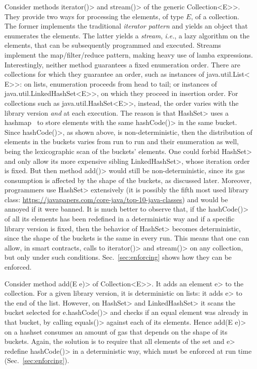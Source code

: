 Consider methods \<iterator()> and \<stream()> of the generic
\<Collection$\text{<}$E$\text{>}$>. They provide two ways for
processing the elements, of type $E$, of a collection. The former implements
the traditional \emph{iterator pattern} and yields an object that enumerates
the elements. The latter yields a \emph{stream}, \emph{i.e.},
a lazy algorithm on the
elements, that can be subsequently programmed and executed.
Streams implement the map/filter/reduce pattern, making
heavy use of lamba expressions.
Interestingly, neither method
guarantees a fixed enumeration order.
There are collections for which they
guarantee an order, such as instances of \<java.util.List$\text{<}$E$\text{>}$>:
on lists, enumeration proceeds from head to tail;
or instances of \<java.util.LinkedHashSet$\text{<}$E$\text{>}$>, on which they proceed in
insertion order.
For collections such as \<java.util.HashSet$\text{<}$E$\text{>}$>, instead, the order
varies with the library version \emph{and} at each execution. The reason is that
\<HashSet> uses a hashmap~\cite{CormenLRS09}
to store elements with the same \<hashCode()> in the same bucket.
Since \<hashCode()>, as shown above, is non-deterministic, then
the distribution of elements in the buckets varies from run to run and their enumeration
as well, being the lexicographic scan of the buckets' elements.
One could forbid \<HashSet> and only allow its
more expensive sibling \<LinkedHashSet>, whose iteration order is fixed.
But then method \<add()> would still be non-deterministic, since its gas consumption
is affected by the shape of the buckets, as discussed later.
Moreover, programmers use \<HashSet> extensively
(it is possibly the fifth most used library class:
\url{https://javapapers.com/core-java/top-10-java-classes})
and would be annoyed if it were
banned. It is much better to observe that,
if the \<hashCode()> of all its elements has been redefined in a deterministic way
and if a specific library version is fixed, then the behavior of \<HashSet> becomes
deterministic, since the shape of the buckets is the same in every run. This means that one
can allow, in smart contracts, calls to \<iterator()> and \<stream()> on any collection,
but only under such conditions. Sec.~\ref{sec:enforcing} shows how they can be enforced.

Consider method \<add(E e)> of \<Collection$\text{<}$E$\text{>}$>.
It adds an element \<e> to the collection. For a given library version,
it is deterministic on lists: it adds \<e> to the end of the list.
However, on \<HashSet> and \<LinkedHashSet> it scans the bucket selected
for \<e.hashCode()> and checks if an equal element was already in that
bucket, by calling \<equals()> against each of its elements. Hence \<add(E e)>
on a hashset consumes an amount of gas that depends on the shape of its buckets.
Again, the solution is to require that all elements of the set and \<e> redefine
\<hashCode()> in a deterministic way, which must be enforced at run time
(Sec.~\ref{sec:enforcing}).

